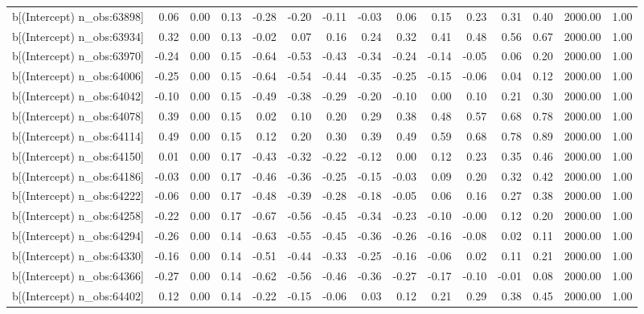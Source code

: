 \begin{table}[ht]
\begin{tabular}{rrrrrrrrrrrrrrr}
  b[(Intercept) n\_obs:63898] & 0.06 & 0.00 & 0.13 & -0.28 & -0.20 & -0.11 & -0.03 & 0.06 & 0.15 & 0.23 & 0.31 & 0.40 & 2000.00 & 1.00 \\ 
  b[(Intercept) n\_obs:63934] & 0.32 & 0.00 & 0.13 & -0.02 & 0.07 & 0.16 & 0.24 & 0.32 & 0.41 & 0.48 & 0.56 & 0.67 & 2000.00 & 1.00 \\ 
  b[(Intercept) n\_obs:63970] & -0.24 & 0.00 & 0.15 & -0.64 & -0.53 & -0.43 & -0.34 & -0.24 & -0.14 & -0.05 & 0.06 & 0.20 & 2000.00 & 1.00 \\ 
  b[(Intercept) n\_obs:64006] & -0.25 & 0.00 & 0.15 & -0.64 & -0.54 & -0.44 & -0.35 & -0.25 & -0.15 & -0.06 & 0.04 & 0.12 & 2000.00 & 1.00 \\ 
  b[(Intercept) n\_obs:64042] & -0.10 & 0.00 & 0.15 & -0.49 & -0.38 & -0.29 & -0.20 & -0.10 & 0.00 & 0.10 & 0.21 & 0.30 & 2000.00 & 1.00 \\ 
  b[(Intercept) n\_obs:64078] & 0.39 & 0.00 & 0.15 & 0.02 & 0.10 & 0.20 & 0.29 & 0.38 & 0.48 & 0.57 & 0.68 & 0.78 & 2000.00 & 1.00 \\ 
  b[(Intercept) n\_obs:64114] & 0.49 & 0.00 & 0.15 & 0.12 & 0.20 & 0.30 & 0.39 & 0.49 & 0.59 & 0.68 & 0.78 & 0.89 & 2000.00 & 1.00 \\ 
  b[(Intercept) n\_obs:64150] & 0.01 & 0.00 & 0.17 & -0.43 & -0.32 & -0.22 & -0.12 & 0.00 & 0.12 & 0.23 & 0.35 & 0.46 & 2000.00 & 1.00 \\ 
  b[(Intercept) n\_obs:64186] & -0.03 & 0.00 & 0.17 & -0.46 & -0.36 & -0.25 & -0.15 & -0.03 & 0.09 & 0.20 & 0.32 & 0.42 & 2000.00 & 1.00 \\ 
  b[(Intercept) n\_obs:64222] & -0.06 & 0.00 & 0.17 & -0.48 & -0.39 & -0.28 & -0.18 & -0.05 & 0.06 & 0.16 & 0.27 & 0.38 & 2000.00 & 1.00 \\ 
  b[(Intercept) n\_obs:64258] & -0.22 & 0.00 & 0.17 & -0.67 & -0.56 & -0.45 & -0.34 & -0.23 & -0.10 & -0.00 & 0.12 & 0.20 & 2000.00 & 1.00 \\ 
  b[(Intercept) n\_obs:64294] & -0.26 & 0.00 & 0.14 & -0.63 & -0.55 & -0.45 & -0.36 & -0.26 & -0.16 & -0.08 & 0.02 & 0.11 & 2000.00 & 1.00 \\ 
  b[(Intercept) n\_obs:64330] & -0.16 & 0.00 & 0.14 & -0.51 & -0.44 & -0.33 & -0.25 & -0.16 & -0.06 & 0.02 & 0.11 & 0.21 & 2000.00 & 1.00 \\ 
  b[(Intercept) n\_obs:64366] & -0.27 & 0.00 & 0.14 & -0.62 & -0.56 & -0.46 & -0.36 & -0.27 & -0.17 & -0.10 & -0.01 & 0.08 & 2000.00 & 1.00 \\ 
  b[(Intercept) n\_obs:64402] & 0.12 & 0.00 & 0.14 & -0.22 & -0.15 & -0.06 & 0.03 & 0.12 & 0.21 & 0.29 & 0.38 & 0.45 & 2000.00 & 1.00 \\ 

\end{tabular}
\end{table}

